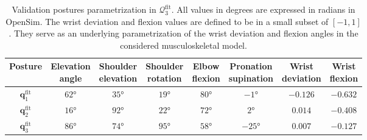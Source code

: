 \begin{table}[!ht]
    \centering
    \begin{tabular}{|c||c|c|c|c|c|c|c|}
    \hline
    Posture & \makecell{Elevation \\ angle} & \makecell{Shoulder \\ elevation} & \makecell{Shoulder \\ rotation} & \makecell{Elbow \\flexion} & \makecell{Pronation \\ supination} & \makecell{Wrist \\ deviation} & \makecell{Wrist \\ flexion} \\
    \hline
    $\mathbf{q}_1^{\text{fit}}$ & $62$° & $35$° & $19$° & $80$° & $-1$° & $-0.126$ & $-0.632$ \\
    $\mathbf{q}_2^{\text{fit}}$ & $16$° & $92$° & $22$° & $72$° & $2$° & $0.014$ & $-0.408$ \\
    $\mathbf{q}_3^{\text{fit}}$ & $86$° & $74$° & $95$° & $58$° & $-25$° & $0.007$ & $-0.127$ \\
    \hline
    \end{tabular}
    \caption{Validation postures parametrization in $\mathcal{Q}_3^{\text{fit}}$. All values in degrees are expressed in radians in OpenSim. The wrist deviation and flexion values are defined to be in a small subset of $[-1,1]$. They serve as an underlying parametrization of the wrist deviation and flexion angles in the considered musculoskeletal model.}
    \label{tab:postures_fit_3_value}
\end{table}

